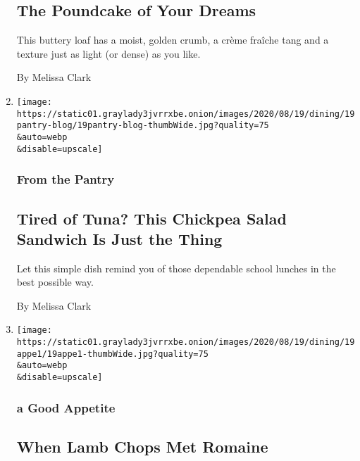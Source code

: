 \begin{enumerate}
  \hypertarget{the-poundcake-of-your-dreams}{%
  \subsection{The Poundcake of Your
  Dreams}\label{the-poundcake-of-your-dreams}}

  This buttery loaf has a moist, golden crumb, a crème fraîche tang and
  a texture just as light (or dense) as you like.

  By Melissa Clark
\item
  \href{/2020/08/19/dining/chickpea-salad-recipe.html}{}

  \texttt{[image: https://static01.graylady3jvrrxbe.onion/images/2020/08/19/dining/19pantry-blog/19pantry-blog-thumbWide.jpg?quality=75\\\&auto=webp\\\&disable=upscale]}

  \hypertarget{from-the-pantry-3}{%
  \subsubsection{From the Pantry}\label{from-the-pantry-3}}

  \hypertarget{tired-of-tuna-this-chickpea-salad-sandwich-is-just-the-thing}{%
  \subsection{Tired of Tuna? This Chickpea Salad Sandwich Is Just the
  Thing}\label{tired-of-tuna-this-chickpea-salad-sandwich-is-just-the-thing}}

  Let this simple dish remind you of those dependable school lunches in
  the best possible way.

  By Melissa Clark
\item
  \href{/2020/08/14/dining/grilled-lamb-chops-recipe.html}{}

  \texttt{[image: https://static01.graylady3jvrrxbe.onion/images/2020/08/19/dining/19appe1/19appe1-thumbWide.jpg?quality=75\\\&auto=webp\\\&disable=upscale]}

  \hypertarget{a-good-appetite-4}{%
  \subsubsection{a Good Appetite}\label{a-good-appetite-4}}

  \hypertarget{when-lamb-chops-met-romaine}{%
  \subsection{When Lamb Chops Met
  Romaine}\label{when-lamb-chops-met-romaine}}


\end{enumerate}
